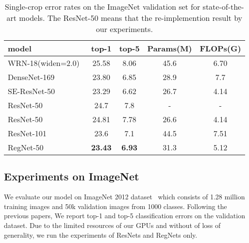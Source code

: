 \documentclass[journal,comsoc]{IEEEtran}
\begin{document}
 

\begin{table}[h]
\caption{Single-crop error rates on the ImageNet validation set for state-of-the-art models. The ResNet-50 means that the re-implemention result by our experiments. 
}
\begin{center}
\begin{tabular}{l|c|c|c|c}
\hline
model     & top-1 & top-5 &Params(M) &FLOPs(G)\\
\hline \hline


WRN-18(widen=2.0)~\cite{DBLP:journals/corr/ZagoruykoK16}&25.58   & 8.06 &45.6 & 6.70\\

\hline

DenseNet-169~\cite{DBLP:journals/corr/HuangLW16a}  &  23.80 & 6.85 &28.9&7.7 \\
\hline
SE-ResNet-50~\cite{DBLP:journals/corr/abs-1709-01507}  & 23.29 & 6.62 & 26.7 & 4.14\\
\hline
\hline

ResNet-50~\cite{DBLP:journals/corr/HeZRS15}  & 24.7    &  7.8 &- & -\\
ResNet-50  & 24.81    &  7.78 &26.6& 4.14  \\
ResNet-101~\cite{DBLP:journals/corr/HeZRS15}  & 23.6    & 7.1 & 44.5 &7.51 \\
RegNet-50 &\textbf{23.43}  &\textbf{6.93} &31.3&5.12  \\

\hline
\end{tabular}
\end{center}
\label{table:imagenet_classification}
\end{table}


\subsection{Experiments on ImageNet}













We evaluate our model on ImageNet 2012 dataset~\cite{DBLP:journals/corr/SimonyanZ14a} which consists of 1.28 million training images and 50k validation images from 1000 classes. Following the previous papers, We report top-1 and top-5 classification errors on the validation dataset.
Due to the limited resources of our GPUs and without of loss of generality, we  run the experiments of ResNets and RegNets only.
\end{document}
